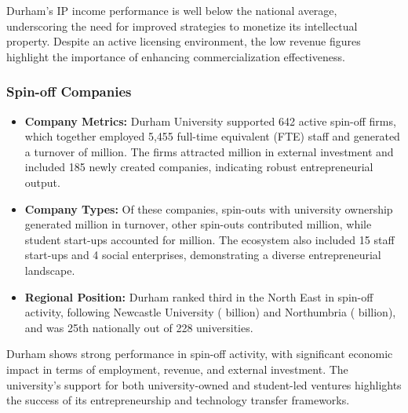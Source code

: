 \documentclass[journal,onecolumn, 10pt,draftclsnofoot]{IEEEtran}
\begin{document}
Durham's IP income performance is well below the national average, underscoring the need for improved strategies to monetize its intellectual property. Despite an active licensing environment, the low revenue figures highlight the importance of enhancing commercialization effectiveness.

\subsubsection{Spin-off Companies}

\begin{itemize}
    \item \textbf{Company Metrics:} Durham University supported 642 active spin-off firms, which together employed 5,455 full-time equivalent (FTE) staff and generated a turnover of  million. The firms attracted  million in external investment and included 185 newly created companies, indicating robust entrepreneurial output.
    
    \item \textbf{Company Types:} Of these companies, spin-outs with university ownership generated  million in turnover, other spin-outs contributed  million, while student start-ups accounted for  million. The ecosystem also included 15 staff start-ups and 4 social enterprises, demonstrating a diverse entrepreneurial landscape.
    
    \item \textbf{Regional Position:} Durham ranked third in the North East in spin-off activity, following Newcastle University ( billion) and Northumbria ( billion), and was 25th nationally out of 228 universities.
\end{itemize}



Durham shows strong performance in spin-off activity, with significant economic impact in terms of employment, revenue, and external investment. The university's support for both university-owned and student-led ventures highlights the success of its entrepreneurship and technology transfer frameworks.

\end{document}
